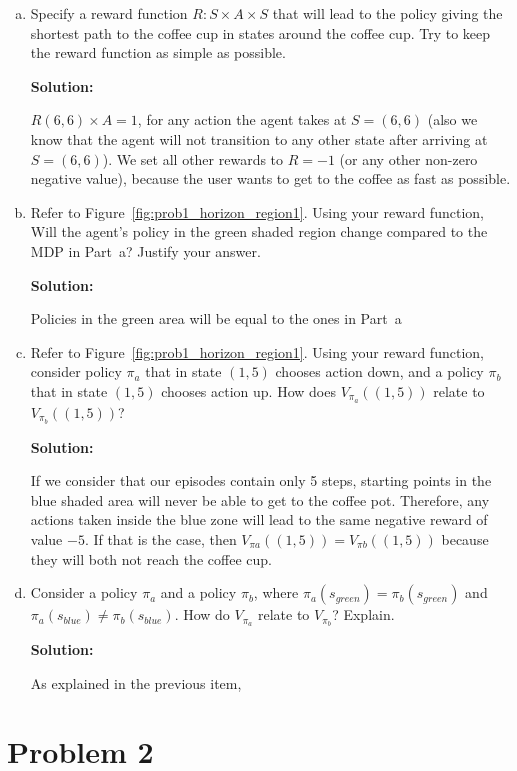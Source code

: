 \documentclass[12pt]{article}
\begin{document}
\begin{enumerate}[a)]
\item Specify a reward function $R : S \times A \times S$ that will lead to the
  policy giving the shortest path to the coffee cup in states around
  the coffee cup. Try to keep the reward function as simple as possible.

  \textbf{Solution:}

$R (6,6) \times A =1$, for any action the agent takes at $S=(6,6)$ (also we know that the agent will not transition to any other state after arriving at  $S=(6,6)$). We set all other rewards to $R=-1$ (or any other non-zero negative value), because the user wants to get to the coffee as fast as possible.

\item Refer to Figure~\ref{fig:prob1_horizon_region1}. Using your
  reward function, Will the agent's policy in the green shaded region
  change compared to the MDP in Part~a? Justify your answer.

  \textbf{Solution:}

Policies in the green area will be equal to the ones in Part~a

\item Refer to Figure~\ref{fig:prob1_horizon_region1}. Using your
  reward function, consider policy $\pi_a$ that in state $(1,5)$
  chooses action down, and a policy $\pi_b$ that in state
  $(1,5)$ chooses action up. How does $V_{\pi_a} ((1, 5))$ relate to
  $V_{\pi_b}((1,5))$?

  \textbf{Solution:}

If we consider that our episodes contain only 5 steps, starting points in the blue shaded area will never be able to get to the coffee pot. Therefore, any actions taken inside the blue zone will lead to the same negative reward of value $-5$. If that is the case, then $V_{\pi a}((1,5))=V_{\pi b}((1,5))$ because they will both not reach the coffee cup.

\item Consider a policy $\pi_a$ and a policy $\pi_b$, where
  $\pi_a(s_{green}) = \pi_b(s_{green})$ and
  $\pi_a(s_{blue}) \not= \pi_b(s_{blue})$. How do $V_{\pi_a}$ relate
  to $V_{\pi_b}$? Explain.

  \textbf{Solution:}

  As explained in the previous item, 

\end{enumerate}

\section*{Problem 2}
\end{document}
